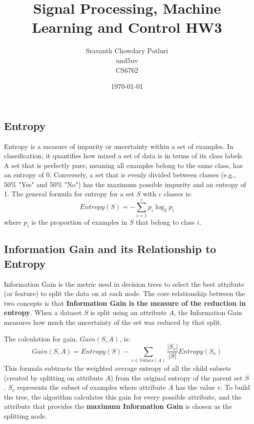 \documentclass[a4paper,12pt]{article}
\title{Signal Processing, Machine Learning and Control HW3}
\author{Sravanth Chowdary Potluri \\ und5uv \\ CS6762}
\date{\today}
\begin{document}
\maketitle

\section{}

\subsection{Entropy}
Entropy is a measure of impurity or uncertainty within a set of examples. In classification, it quantifies how mixed a set of data is in terms of its class labels. A set that is perfectly pure, meaning all examples belong to the same class, has an entropy of 0. Conversely, a set that is evenly divided between classes (e.g., 50\% "Yes" and 50\% "No") has the maximum possible impurity and an entropy of 1. The general formula for entropy for a set $S$ with $c$ classes is:
$$
Entropy(S) = -\sum_{i=1}^{c} p_{i} \log_{2} p_{i}
$$
where $p_i$ is the proportion of examples in $S$ that belong to class $i$.

\subsection{Information Gain and its Relationship to Entropy}
Information Gain is the metric used in decision trees to select the best attribute (or feature) to split the data on at each node. The core relationship between the two concepts is that \textbf{Information Gain is the measure of the reduction in entropy}. When a dataset $S$ is split using an attribute $A$, the Information Gain measures how much the uncertainty of the set was reduced by that split.

The calculation for gain, $Gain(S, A)$, is:
$$
Gain(S, A) = Entropy(S) - \sum_{v \in Values(A)} \frac{|S_v|}{|S|} Entropy(S_v)
$$
This formula subtracts the weighted average entropy of all the child subsets (created by splitting on attribute $A$) from the original entropy of the parent set $S$. $S_v$ represents the subset of examples where attribute $A$ has the value $v$. To build the tree, the algorithm calculates this gain for every possible attribute, and the attribute that provides the \textbf{maximum Information Gain} is chosen as the splitting node.

\section{}
\end{document}
